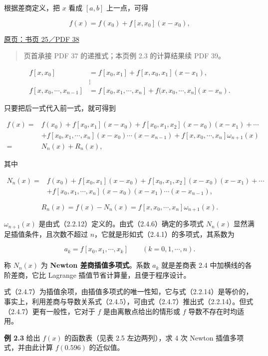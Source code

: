 \documentclass[
  10pt,
  fontset=fandol]{ctexart}
\begin{document}
根据差商定义，把 \(x\) 看成 \([a,b]\) 上一点，可得

\[
f(x)=f(x_0)+f[x,x_0](x-x_0),
\]

\href{../../source-images/pdf-038.jpeg}{原页：书页 25／PDF 38}

\begin{quote}
页首承接 PDF 37 的递推式；本页例 2.3 的计算结果续 PDF 39。
\end{quote}

\[
\begin{aligned}
f[x,x_0]&=f[x_0,x_1]+f[x,x_0,x_1](x-x_1),\\
&\vdots\\
f[x,x_0,\cdots,x_{n-1}]&=f[x_0,x_1,\cdots,x_n]+f(x,x_0,\cdots,x_n](x-x_n).
\end{aligned}
\]

只要把后一式代入前一式，就可得到

\[
\begin{aligned}
f(x)={}&f(x_0)+f[x_0,x_1](x-x_0)+f[x_0,x_1,x_2](x-x_0)(x-x_1)+\cdots\\
&+f[x_0,x_1,\cdots,x_n](x-x_0)\cdots(x-x_{n-1})+f[x,x_0,\cdots,x_n]\omega_{n+1}(x)\\
={}&N_n(x)+R_n(x),
\end{aligned}
\]

其中

\[
\begin{aligned}
N_n(x)={}&f(x_0)+f[x_0,x_1](x-x_0)+f[x_0,x_1,x_2](x-x_0)(x-x_1)+\cdots\\
&+f[x_0,x_1,\cdots,x_n](x-x_0)(x-x_1)\cdots(x-x_{n-1}),
\end{aligned}
\tag{2.4.6}
\]

\[
R_n(x)=f(x)-N_n(x)=f[x,x_0,\cdots,x_n]\omega_{n+1}(x).
\tag{2.4.7}
\]

\(\omega_{n+1}(x)\) 是由式（2.2.12）定义的。由式（2.4.6）确定的多项式 \(N_n(x)\) 显然满足插值条件，且次数不超过 \(n\)，它就是形如式（2.4.1）的多项式，其系数为

\[
a_k=f[x_0,x_1,\cdots,x_k]\qquad(k=0,1,\cdots,n).
\]

称 \(N_n(x)\) 为 \textbf{Newton 差商插值多项式}。系数 \(a_k\) 就是差商表 2.4 中加横线的各阶差商，它比 Lagrange 插值节省计算量，且便于程序设计。

式（2.4.7）为插值余项，由插值多项式的唯一性知，它与式（2.2.14）是等价的，事实上，利用差商与导数关系式（2.4.5），可由式（2.4.7）推出式（2.2.14）。但式（2.4.7）更有一般性，它对于 \(f\) 是由离散点给出的情形或 \(f\) 导数不存在时均适用。

\textbf{例 2.3} 给出 \(f(x)\) 的函数表（见表 2.5 左边两列），求 4 次 Newton 插值多项式，并由此计算 \(f(0.596)\) 的近似值。
\end{document}
